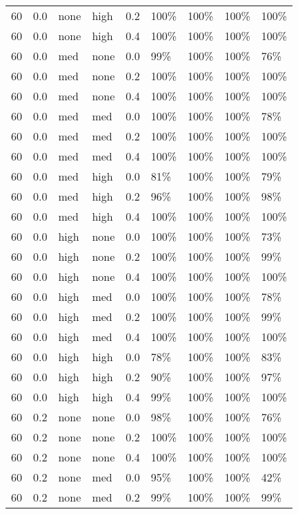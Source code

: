 \begin{longtable}{rrllrllll}
  60 & 0.0 & none & high & 0.2 & 100\% & 100\% & 100\% & 100\% \\ 
  60 & 0.0 & none & high & 0.4 & 100\% & 100\% & 100\% & 100\% \\ 
  60 & 0.0 & med & none & 0.0 & 99\% & 100\% & 100\% & 76\% \\ 
  60 & 0.0 & med & none & 0.2 & 100\% & 100\% & 100\% & 100\% \\ 
  60 & 0.0 & med & none & 0.4 & 100\% & 100\% & 100\% & 100\% \\ 
  60 & 0.0 & med & med & 0.0 & 100\% & 100\% & 100\% & 78\% \\ 
  60 & 0.0 & med & med & 0.2 & 100\% & 100\% & 100\% & 100\% \\ 
  60 & 0.0 & med & med & 0.4 & 100\% & 100\% & 100\% & 100\% \\ 
  60 & 0.0 & med & high & 0.0 & 81\% & 100\% & 100\% & 79\% \\ 
  60 & 0.0 & med & high & 0.2 & 96\% & 100\% & 100\% & 98\% \\ 
  60 & 0.0 & med & high & 0.4 & 100\% & 100\% & 100\% & 100\% \\ 
  60 & 0.0 & high & none & 0.0 & 100\% & 100\% & 100\% & 73\% \\ 
  60 & 0.0 & high & none & 0.2 & 100\% & 100\% & 100\% & 99\% \\ 
  60 & 0.0 & high & none & 0.4 & 100\% & 100\% & 100\% & 100\% \\ 
  60 & 0.0 & high & med & 0.0 & 100\% & 100\% & 100\% & 78\% \\ 
  60 & 0.0 & high & med & 0.2 & 100\% & 100\% & 100\% & 99\% \\ 
  60 & 0.0 & high & med & 0.4 & 100\% & 100\% & 100\% & 100\% \\ 
  60 & 0.0 & high & high & 0.0 & 78\% & 100\% & 100\% & 83\% \\ 
  60 & 0.0 & high & high & 0.2 & 90\% & 100\% & 100\% & 97\% \\ 
  60 & 0.0 & high & high & 0.4 & 99\% & 100\% & 100\% & 100\% \\ 
  60 & 0.2 & none & none & 0.0 & 98\% & 100\% & 100\% & 76\% \\ 
  60 & 0.2 & none & none & 0.2 & 100\% & 100\% & 100\% & 100\% \\ 
  60 & 0.2 & none & none & 0.4 & 100\% & 100\% & 100\% & 100\% \\ 
  60 & 0.2 & none & med & 0.0 & 95\% & 100\% & 100\% & 42\% \\ 
  60 & 0.2 & none & med & 0.2 & 99\% & 100\% & 100\% & 99\% \\ 

\end{longtable}
